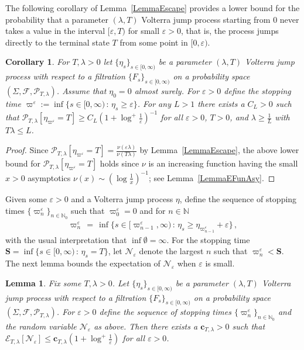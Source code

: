 \documentclass[10pt]{article}
\numberwithin{equation}{section}
\newtheorem{lemma}[theorem]{Lemma}
\newtheorem{corollary}[theorem]{Corollary}
\theoremstyle{definition}
\begin{document}
The following corollary of Lemma~\ref{LemmaEscape} provides a lower bound for the probability that a parameter $(\lambda,T)$ Volterra jump  process starting from $0$ never takes a value in the interval $[\varepsilon, T)$ for small $\varepsilon>0$, that is, the process jumps directly to the terminal state $T$ from some point in $[0,\varepsilon)$.
\begin{corollary}\label{CorollaryEscape} For $T,\lambda>0$ let  $\{ \eta_s \}_{s\in [0,\infty)}$ be a parameter $(\lambda,T)$ Volterra jump process   with respect to a filtration $\{ F_s\}_{s\in [0,\infty)}$ on a probability space  $(\Sigma, \mathcal{F},\mathcal{P}_{T,\lambda})$.  Assume that $\eta_0=0$ almost surely.  For $\varepsilon>0$  define the stopping time $ \varpi^{\varepsilon}:=\inf\{s\in [0,\infty) \,:\,  \eta_s  \geq  \varepsilon  \}$. For any $L>1$ there exists a  $C_{L}>0$ such that $\mathcal{P}_{T,\lambda}[\eta_{ \varpi^{\varepsilon} } =T]\geq C_{L} (1+ \log^+  \frac{1}{\varepsilon} )^{-1}$ for all $\varepsilon>0$, $T >0$, and $\lambda\geq \frac{1}{L}$ with $T\lambda \leq L $.
\end{corollary}
\begin{proof}
Since $\mathcal{P}_{T,\lambda}[\eta_{ \varpi^{\varepsilon} } =T]=\frac{\nu(\varepsilon \lambda)}{\nu(T \lambda) } $ by Lemma~\ref{LemmaEscape}, the above lower bound for  $\mathcal{P}_{T,\lambda}[\eta_{ \varpi^{\varepsilon} } =T]$ holds since 
 $\nu$ is an increasing function having the small $x>0$ asymptotics $\nu(x)\sim (  \log  \frac{1}{x} )^{-1}   $; see Lemma~\ref{LemmaEFunAsy}.    
\end{proof}


Given  some  $\varepsilon >0$ and a Volterra jump process $\eta$,  define the sequence of stopping times $\{ \varpi_{n}^{\varepsilon} \}_{n\in \mathbb{N}_0}$  such that $\varpi_{0}^{\varepsilon}=0$ and for $n\in \mathbb{N}$
\begin{align}\label{DefVarpis}
    \varpi_{n}^{\varepsilon} \,=\, \inf\big\{ s\in \big[\varpi_{n-1}^{\varepsilon},\infty\big) \,:\,\eta_s\geq \eta_{ \varpi_{n-1}^{\varepsilon} }+\varepsilon\big\}\,,
\end{align}
with the usual interpretation that $\inf \emptyset =\infty$.  For the stopping time $\mathbf{S}=\inf\{s\in [0,\infty)\,:\,  \eta_s=T \}$, let $\mathscr{N}_{\varepsilon}$ denote the largest $n$ such that $\varpi_{n}^{\varepsilon} <\mathbf{S}$. The next lemma bounds the expectation of $\mathscr{N}_{\varepsilon}$ when $\varepsilon$ is small.
\begin{lemma}\label{LemmaEscapeTimes} Fix some $T,\lambda>0$.  Let  $\{ \eta_s \}_{s\in [0,\infty)}$ be a parameter $(\lambda,T)$ Volterra jump process with respect to a filtration $\{  F_s\}_{s\in [0,\infty)}$  on a probability space  $(\Sigma, \mathcal{F},\mathcal{P}_{T,\lambda})$. For $\varepsilon>0$  define the sequence of stopping times $\{ \varpi_{n}^{\varepsilon} \}_{n\in \mathbb{N}_0}$  and the random variable $\mathscr{N}_{\varepsilon}$  as above. Then there exists a  $\mathbf{c}_{T,\lambda}>0$ such that $\mathcal{E}_{T,\lambda}[  \mathscr{N}_{\varepsilon} ] \leq  \mathbf{c}_{T,\lambda}(  1+\log^+ \frac{1}{\varepsilon}   )$ for all $\varepsilon >0$.


\end{lemma}
\end{document}

